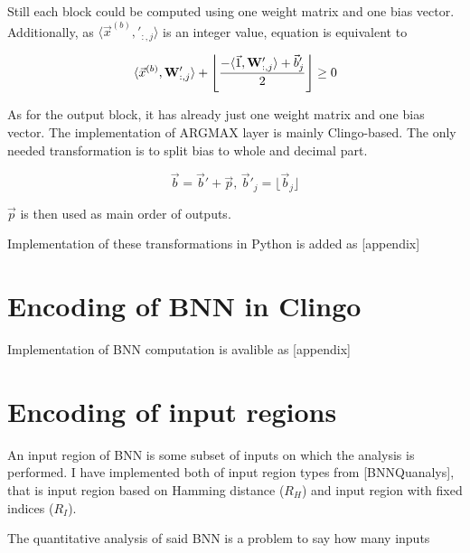 \documentclass{fithesis}
\newcommand{\mat}[1]{\mathbf{#1}}
\begin{document}
Still each block could be computed using one weight matrix and one bias vector.
Additionally, as $\langle\vec x^{(b)}, \mat'_{:, j}\rangle$ is an integer value,
equation is equivalent to

\begin{equation*}
    \langle \vec x^{(b)}, \mat W'_{:, j}\rangle + \left\lfloor \frac{- \langle\vec1, \mat W'_{:,j}\rangle + \vec b'_j}{2} \right\rfloor \geq 0\\
\end{equation*}

As for the output block, it has already just one weight matrix and one bias
vector. The implementation of ARGMAX layer is mainly Clingo-based.
The only needed transformation is to split bias to whole and decimal part.

\begin{equation*}
    \vec b = \vec b' + \vec p, \, \vec b'_j = \lfloor \vec b_j \rfloor
\end{equation*}

$\vec p$ is then used as main order of outputs.

Implementation of these transformations in Python is added as [appendix] %

\section{Encoding of BNN in Clingo}

Implementation of BNN computation is avalible as [appendix] %

\section{Encoding of input regions}

An input region of BNN is some subset of inputs on which the analysis is
performed. I have implemented both of input region types from [BNNQuanalys],
that is input region based on Hamming distance ($R_H$) and input region with
fixed indices ($R_I$).

The quantitative analysis of said BNN is a problem to say how many inputs


\end{document}
